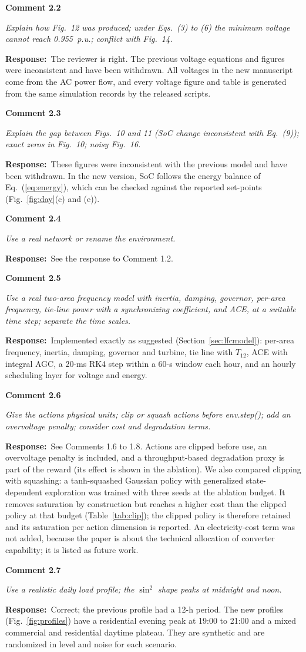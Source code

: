 \documentclass[10pt,a4paper]{article}
\newcommand{\rc}[1]{\par\noindent\textbf{Comment #1}\par}
\newcommand{\resp}{\par\noindent\textbf{Response:}\ }
\begin{document}
\rc{2.2} \emph{Explain how Fig.~12 was produced; under Eqs.~(3) to (6)
the minimum voltage cannot reach 0.955~p.u.; conflict with Fig.~14.}
\resp The reviewer is right. The previous voltage equations and figures
were inconsistent and have been withdrawn. All voltages in the new
manuscript come from the AC power flow, and every voltage figure and
table is generated from the same simulation records by the released
scripts.

\rc{2.3} \emph{Explain the gap between Figs.~10 and 11 (SoC change
inconsistent with Eq.~(9)); exact zeros in Fig.~10; noisy Fig.~16.}
\resp These figures were inconsistent with the previous model and have
been withdrawn. In the new version, SoC follows the energy balance of
Eq.~(\ref{eq:energy}), which can be checked against the reported set-points
(Fig.~\ref{fig:day}(c) and (e)).

\rc{2.4} \emph{Use a real network or rename the environment.}
\resp See the response to Comment 1.2.

\rc{2.5} \emph{Use a real two-area frequency model with inertia,
damping, governor, per-area frequency, tie-line power with a
synchronizing coefficient, and ACE, at a suitable time step; separate
the time scales.}
\resp Implemented exactly as suggested (Section~\ref{sec:lfcmodel}): per-area
frequency, inertia, damping, governor and turbine, tie line with
$T_{12}$, ACE with integral AGC, a 20-ms RK4 step within a 60-s window
each hour, and an hourly scheduling layer for voltage and energy.

\rc{2.6} \emph{Give the actions physical units; clip or squash actions
before env.step(); add an overvoltage penalty; consider cost and
degradation terms.}
\resp See Comments 1.6 to 1.8. Actions are clipped before use, an
overvoltage penalty is included, and a throughput-based degradation
proxy is part of the reward (its effect is shown in the ablation). We
also compared clipping with squashing: a tanh-squashed Gaussian policy
with generalized state-dependent exploration was trained with three
seeds at the ablation budget. It removes saturation by construction
but reaches a higher cost than the clipped policy at that budget
(Table~\ref{tab:clip}); the clipped policy is therefore retained and
its saturation per action dimension is reported. An electricity-cost
term was not added, because the paper is about the technical
allocation of converter capability; it is listed as future work.

\rc{2.7} \emph{Use a realistic daily load profile; the $\sin^2$ shape
peaks at midnight and noon.}
\resp Correct; the previous profile had a 12-h period. The new profiles
(Fig.~\ref{fig:profiles}) have a residential evening peak at 19:00 to 21:00 and a mixed
commercial and residential daytime plateau. They are synthetic and
are randomized in level and noise for each scenario.
\end{document}
